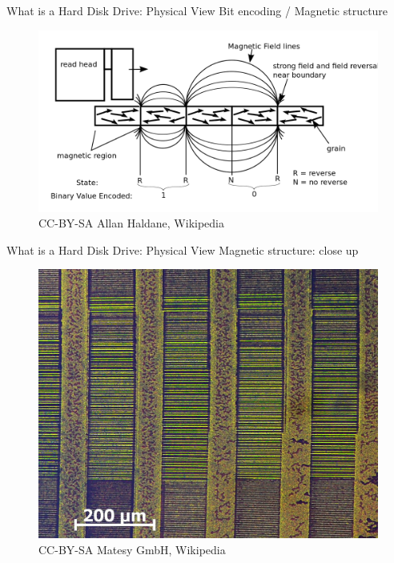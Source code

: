 \documentclass[12pt]{beamer}
\begin{document}
\begin{frame}[fragile]{What is a Hard Disk Drive: Physical View}
	Bit encoding / Magnetic structure
\begin{figure}[p]
	\centering
	\includegraphics[width=\linewidth]{img/magnetic_track.png}
	\caption{CC-BY-SA Allan Haldane, Wikipedia}
\end{figure}
\end{frame}


\begin{frame}[fragile]{What is a Hard Disk Drive: Physical View}
	Magnetic structure: close up
	\begin{figure}[p]
		\centering
		\includegraphics[width=0.7\linewidth]{img/floppy_physical.jpg}
		\caption{CC-BY-SA Matesy GmbH, Wikipedia}
	\end{figure}
\end{frame}
\end{document}
